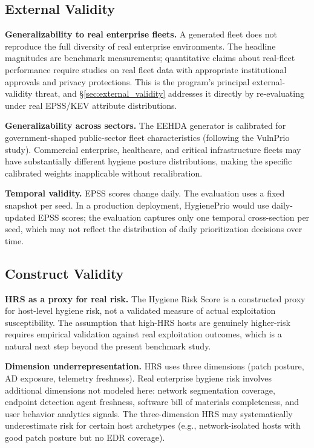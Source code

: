 \subsection{External Validity}

\textbf{Generalizability to real enterprise fleets.} A generated fleet does not reproduce the full diversity of real enterprise environments. The headline magnitudes are benchmark measurements; quantitative claims about real-fleet performance require studies on real fleet data with appropriate institutional approvals and privacy protections. This is the program's principal external-validity threat, and \S\ref{sec:external_validity} addresses it directly by re-evaluating under real EPSS/KEV attribute distributions.

\textbf{Generalizability across sectors.} The EEHDA generator is calibrated for government-shaped public-sector fleet characteristics (following the VulnPrio study). Commercial enterprise, healthcare, and critical infrastructure fleets may have substantially different hygiene posture distributions, making the specific calibrated weights inapplicable without recalibration.

\textbf{Temporal validity.} EPSS scores change daily. The evaluation uses a fixed snapshot per seed. In a production deployment, HygienePrio would use daily-updated EPSS scores; the evaluation captures only one temporal cross-section per seed, which may not reflect the distribution of daily prioritization decisions over time.

\subsection{Construct Validity}

\textbf{HRS as a proxy for real risk.} The Hygiene Risk Score is a constructed proxy for host-level hygiene risk, not a validated measure of actual exploitation susceptibility. The assumption that high-HRS hosts are genuinely higher-risk requires empirical validation against real exploitation outcomes, which is a natural next step beyond the present benchmark study.

\textbf{Dimension underrepresentation.} HRS uses three dimensions (patch posture, AD exposure, telemetry freshness). Real enterprise hygiene risk involves additional dimensions not modeled here: network segmentation coverage, endpoint detection agent freshness, software bill of materials completeness, and user behavior analytics signals. The three-dimension HRS may systematically underestimate risk for certain host archetypes (e.g., network-isolated hosts with good patch posture but no EDR coverage).

